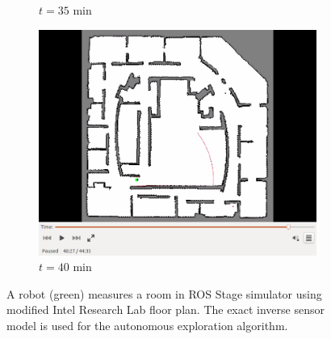 \documentclass[smallextended]{svjour3}       %
\begin{document}
\begin{figure}[!ht]
\begin{subfigure}[t]{0.3\columnwidth}
        \caption{$t=35$ min}
        \label{fig:IRL35min}
    \end{subfigure}
    \begin{subfigure}[t]{0.3\columnwidth}
           \centering
           \includegraphics[trim = {4.6cm 3.8cm 4.6cm 0}, clip, width=\textwidth]{40min.png}
        \caption{$t=40$ min}
        \label{fig:IRL40min}
    \end{subfigure}
    \caption{A robot (green) measures a room in ROS Stage simulator using modified Intel Research Lab floor plan. The exact inverse sensor model is used for the autonomous exploration algorithm.}
    \label{fig:IRL}
\end{figure}
\end{document}
